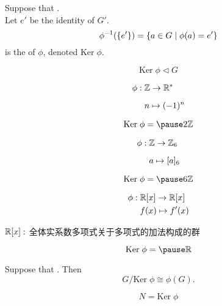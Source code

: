 \begin{frame}
  \begin{definition}[核 (Kernel)]
    Suppose that . \\
    Let $e'$ be the identity of $G'$.
    \[
      \phi^{-1}(\{e'\}) = \{a \in G \mid \phi(a) = e'\}
    \]
    is the  of $\phi$, denoted $\text{Ker}\; \phi$.
  \end{definition}

  \pause
  \[
    \text{Ker}\; \phi \triangleleft G
  \]
\end{frame}

\begin{frame}{}
  \begin{align*}
    \phi:\; & \mathbb{Z} \to \mathbb{R}^{\ast} \\[6pt]
            & n \mapsto (-1)^{n}
  \end{align*}

  \[
    \text{Ker}\; \phi = \pause 2\Z
  \]
\end{frame}

\begin{frame}{}
  \begin{align*}
    \phi:\; & \mathbb{Z} \to \mathbb{Z}_{6} \\[6pt]
            & a \mapsto [a]_{6}
  \end{align*}

  \[
    \text{Ker}\; \phi = \pause 6\Z
  \]
\end{frame}

\begin{frame}{}
  \begin{align*}
    \phi:\; & \mathbb{R}[x] \to \mathbb{R}[x] \\
            & f(x) \mapsto f'(x)
  \end{align*}

  \vspace{0.30cm}
  \begin{center}
    $\mathbb{R}[x]:$ 全体实系数多项式关于多项式的加法构成的群
  \end{center}

  \[
    \text{Ker}\; \phi = \pause \R
  \]
\end{frame}

\begin{frame}
  \begin{theorem}
    Suppose that . Then
    \[
      G/\text{Ker}\; \phi \cong \phi(G).
    \]
  \end{theorem}

  \pause
  \begin{center}
  \end{center}

  \pause
  \[
    N = \text{Ker}\; \phi
  \]
\end{frame}

